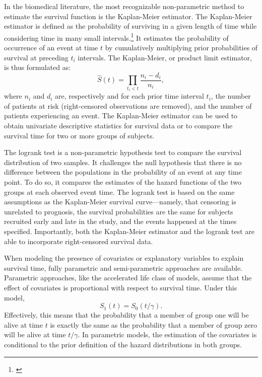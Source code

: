 In the biomedical literature, the most recognizable non-parametric method to
estimate the survival function is the Kaplan-Meier
estimator.\cite{kaplan_nonparametric_1958} The Kaplan-Meier estimator is defined
as the probability of surviving in a given length of time while considering time
in many small intervals.\footnote{\citealp[pp. 365--93]{altman_practical_1990}}
It estimates the probability of occurrence of an event at time $t$ by
cumulatively multiplying prior probabilities of survival at preceding $t_i$
intervals.  The Kaplan-Meier, or product limit estimator, is thus formulated as:
\begin{equation}
  \label{eq:kaplan-meier}
\hat{S}(t)=\prod_{t_i<t}\frac{n_i-d_i}{n_i},
\end{equation}
where $n_i$ and $d_i$ are, respectively and for each prior time interval $t_i$,
the number of patients at risk (right-censored observations are removed), and
the number of patients experiencing an event.  The Kaplan-Meier estimator can be
used to obtain univariate descriptive statistics for survival data or to compare
the survival time for two or more groups of subjects.

The logrank test is a non-parametric hypothesis test to compare the survival
distribution of two
samples.\cite{mantel_evaluation_1966,peto_asymptotically_1972} It challenges the
null hypothesis that there is no difference between the populations in the
probability of an event at any time point.  To do so, it compares the estimates
of the hazard functions of the two groups at each observed event time.  The
logrank test is based on the same assumptions as the Kaplan-Meier survival
curve---namely, that censoring is unrelated to prognosis, the survival
probabilities are the same for subjects recruited early and late in the study,
and the events happened at the times specified.\cite{bland_logrank_2004}
Importantly, both the Kaplan-Meier estimator and the logrank test are able to
incorporate right-censored survival data.

When modeling the presence of covariates or explanatory variables to explain
survival time, fully parametric and semi-parametric approaches are available.
Parametric approaches, like the accelerated life class of models, assume that
the effect of covariates is proportional with respect to survival
time.\cite{kalbfleisch_statistical_2011} Under this model,
\begin{equation}
  \label{eq:aft}
  S_1(t) = S_0(t/\gamma).
\end{equation}
Effectively, this means that the probability that a member of group one will be
alive at time $t$ is exactly the same as the probability that a member of group
zero will be alive at time $t/\gamma$.  In parametric models, the estimation of
the covariates is conditional to the prior definition of the hazard
distributions in both groups.

